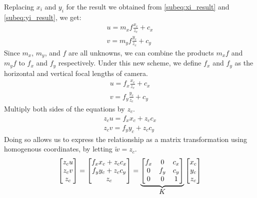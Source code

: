 Replacing $x_i$ and $y_i$ for the result we obtained from \ref{subeq:xi_result} and \ref{subeq:yi_result}, we get:
\begin{align*}
    u = m_x f \frac{x_c}{z_c} + c_x \\
    v = m_y f \frac{y_c}{z_c} + c_y
\end{align*}
Since $m_x$, $m_y$, and $f$ are all unknowns, we can combine the products $m_x f$ and $m_y f$ to $f_x$ and $f_y$ respectively. Under this new scheme, we define $f_x$ and $f_y$ as the horizontal and vertical focal lengths of camera.
\begin{gather*}
    u = f_x \frac{x_c}{z_c} + c_x \\
    v = f_y \frac{y_c}{z_c} + c_y
\end{gather*}
Multiply both sides of the equations by $z_c$.
\begin{subequations}
    \begin{gather}
        z_c u = f_x x_c + z_c c_x \\
        z_c v = f_y y_c + z_c c_y
    \end{gather}
\end{subequations}
Doing so allows us to express the relationship as a matrix transformation using homogenous coordinates, by letting $\widetilde{w} = z_c$. 
\begin{equation}
    \begin{bmatrix}
        z_c u \\ z_c v \\ z_c
    \end{bmatrix}
    =
    \begin{bmatrix}
        f_x x_c + z_c c_x \\ f_y y_c + z_c c_y \\ z_c
    \end{bmatrix}
    =
    \underbrace{
        \begin{bmatrix}
            f_x & 0   & c_x \\
            0   & f_y & c_y \\
            0   & 0   & 1
        \end{bmatrix}
    }_{\mathlarger{K}}
    \begin{bmatrix}
        x_c \\ y_c \\ z_c
    \end{bmatrix}
\end{equation}


